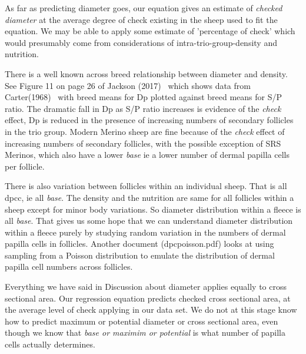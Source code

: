 \documentclass[titlepage]{article}  %
\begin{document}
As far as predicting diameter goes, our equation gives an estimate of {\em checked diameter} at the average degree of check existing in the sheep used to fit the equation. We may be able to apply some estimate of 'percentage of check' which would presumably come from considerations of intra-trio-group-density and nutrition.

There is a well known across breed relationship between diameter and density. See Figure 11 on page 26 of Jackson (2017)~\cite{jack:17b} which shows data from Carter(1968)~\cite{cart:68} with breed means for Dp plotted against breed means for S/P ratio. The dramatic fall in Dp as S/P ratio increases is evidence of the {\em check} effect, Dp is reduced in the presence of increasing numbers of secondary follicles in the trio group.  Modern Merino sheep are fine because of the {\em check} effect of increasing numbers of secondary follicles, with the possible exception of SRS Merinos, which also have a lower {\em base} ie a lower number of dermal papilla cells per follicle.

There is also variation between follicles within an individual sheep. That is all dpcc, ie all {\em base}.  The density and the nutrition are same for all follicles within a sheep except for minor body variations. So diameter distribution within a fleece is all {\em base}. That gives us some hope that we can understand diameter distribution within a fleece purely by studying random variation in the numbers of dermal papilla cells in follicles. Another document (dpcpoisson.pdf) looks at using sampling from a Poisson distribution to emulate the distribution of dermal papilla cell numbers across follicles.

Everything we have said in Discussion about diameter applies equally to cross sectional area. Our regression equation predicts checked cross sectional area, at the average level of check applying in our data set. We do not at this stage know how to predict maximum or potential diameter or cross sectional area, even though we know that {\em base or maximim or potential} is what number of papilla cells actually determines.
\end{document}
